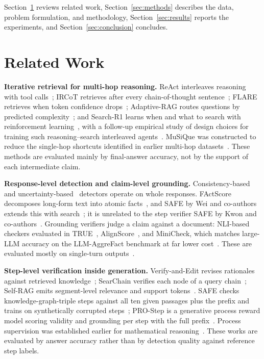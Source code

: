 \documentclass[conference]{IEEEtran}
\begin{document}
Section~\ref{sec:related} reviews related work, Section~\ref{sec:methods} describes the data, problem formulation, and methodology, Section~\ref{sec:results} reports the experiments, and Section~\ref{sec:conclusion} concludes.

\section{Related Work}\label{sec:related}
\textbf{Iterative retrieval for multi-hop reasoning.}
ReAct interleaves reasoning with tool calls~\cite{yao2023react}; IRCoT retrieves after every chain-of-thought sentence~\cite{trivedi2023ircot}; FLARE retrieves when token confidence drops~\cite{jiang2023flare}; Adaptive-RAG routes questions by predicted complexity~\cite{jeong2024adaptive}; and Search-R1 learns when and what to search with reinforcement learning~\cite{jin2025searchr1}, with a follow-up empirical study of design choices for training such reasoning--search interleaved agents~\cite{jin2025empirical}. MuSiQue was constructed to reduce the single-hop shortcuts identified in earlier multi-hop datasets~\cite{min2019compositional,trivedi2022musique}. These methods are evaluated mainly by final-answer accuracy, not by the support of each intermediate claim.

\textbf{Response-level detection and claim-level grounding.}
Consistency-based~\cite{manakul2023selfcheckgpt} and uncertainty-based~\cite{farquhar2024semantic} detectors operate on whole responses. FActScore decomposes long-form text into atomic facts~\cite{min2023factscore}, and SAFE by Wei and co-authors extends this with search~\cite{wei2024longform}; it is unrelated to the step verifier SAFE by Kwon and co-authors~\cite{kwon2026safe}. Grounding verifiers judge a claim against a document: NLI-based checkers evaluated in TRUE~\cite{honovich2022true}, AlignScore~\cite{zha2023alignscore}, and MiniCheck, which matches large-LLM accuracy on the LLM-AggreFact benchmark at far lower cost~\cite{tang2024minicheck}. These are evaluated mostly on single-turn outputs~\cite{niu2024ragtruth}.

\textbf{Step-level verification inside generation.}
Verify-and-Edit revises rationales against retrieved knowledge~\cite{zhao2023verifyedit}; SearChain verifies each node of a query chain~\cite{xu2024searchain}; Self-RAG emits segment-level relevance and support tokens~\cite{asai2024selfrag}. SAFE checks knowledge-graph-triple steps against all ten given passages plus the prefix and trains on synthetically corrupted steps~\cite{kwon2026safe}; PRO-Step is a generative process reward model scoring validity and grounding per step with the full prefix~\cite{kim2026prostep}. Process supervision was established earlier for mathematical reasoning~\cite{lightman2024verify,zheng2024processbench}. These works are evaluated by answer accuracy rather than by detection quality against reference step labels.
\end{document}

